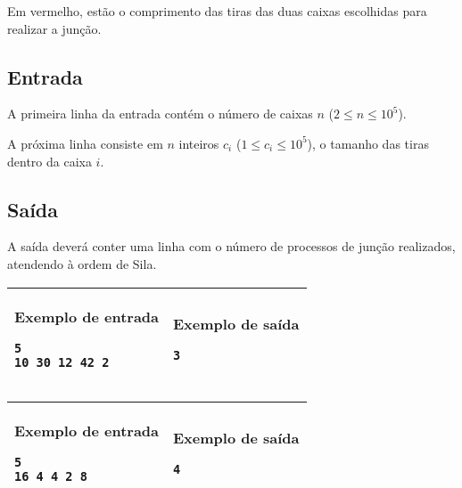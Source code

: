 Em vermelho, estão o comprimento das tiras das duas caixas escolhidas para realizar a junção.

\subsection*{Entrada}
 
A primeira linha da entrada contém o número de caixas $n$ ($2\leq n\leq 10^5$).
 
A próxima linha consiste em $n$ inteiros $c_i$ ($1\leq c_i \leq 10^5$), o tamanho das tiras dentro da caixa $i$.
 
\subsection*{Saída}
A saída deverá conter uma linha com o número de processos de junção realizados, atendendo à ordem de Sila.

\newpage
\begin{table}[!h]
\centering
\begin{tabular}{|l|l|}
\hline
\begin{minipage}[t]{3in}
\textbf{Exemplo de entrada}
\begin{verbatim}
5
10 30 12 42 2
\end{verbatim}
\vspace{1mm}
\end{minipage}
&
\begin{minipage}[t]{3in}
\textbf{Exemplo de saída}
\begin{verbatim}
3
\end{verbatim}
\vspace{1mm}
\end{minipage} \\
\hline
\end{tabular}
\end{table}

\begin{table}[!h]
\centering
\begin{tabular}{|l|l|}
\hline
\begin{minipage}[t]{3in}
\textbf{Exemplo de entrada}
\begin{verbatim}
5
16 4 4 2 8
\end{verbatim}
\vspace{1mm}
\end{minipage}
&
\begin{minipage}[t]{3in}
\textbf{Exemplo de saída}
\begin{verbatim}
4
\end{verbatim}
\vspace{1mm}
\end{minipage} \\
\hline
\end{tabular}
\end{table}

